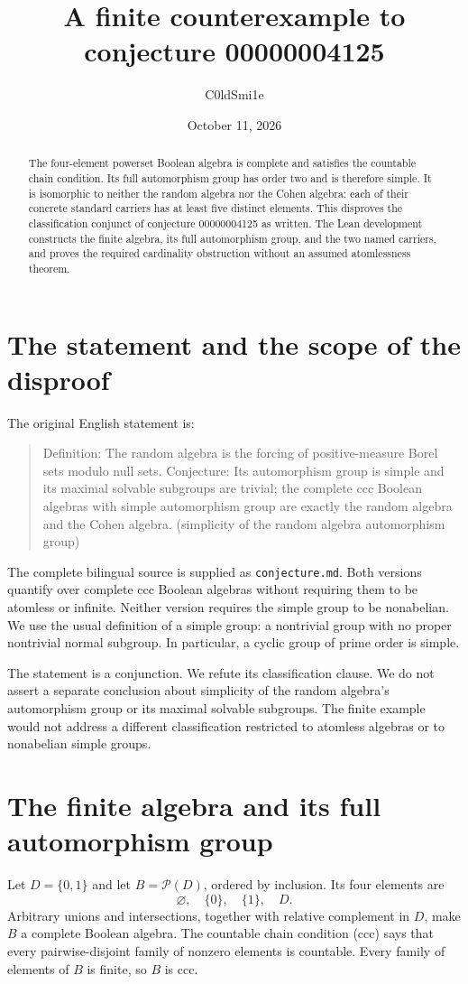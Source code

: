 \documentclass[11pt]{article}
\title{A finite counterexample to conjecture 00000004125}
\author{C0ldSmi1e}
\date{October 11, 2026}
\begin{document}
\maketitle
\begin{abstract}
The four-element powerset Boolean algebra is complete and satisfies the countable chain condition. Its full automorphism group has order two and is therefore simple. It is isomorphic to neither the random algebra nor the Cohen algebra: each of their concrete standard carriers has at least five distinct elements. This disproves the classification conjunct of conjecture 00000004125 as written. The Lean development constructs the finite algebra, its full automorphism group, and the two named carriers, and proves the required cardinality obstruction without an assumed atomlessness theorem.
\end{abstract}

\section{The statement and the scope of the disproof}
The original English statement is:
\begin{quote}
Definition: The random algebra is the forcing of positive-measure Borel sets modulo null sets. Conjecture: Its automorphism group is simple and its maximal solvable subgroups are trivial; the complete ccc Boolean algebras with simple automorphism group are exactly the random algebra and the Cohen algebra. (simplicity of the random algebra automorphism group)
\end{quote}
The complete bilingual source is supplied as \texttt{conjecture.md}. Both versions quantify over complete ccc Boolean algebras without requiring them to be atomless or infinite. Neither version requires the simple group to be nonabelian. We use the usual definition of a simple group: a nontrivial group with no proper nontrivial normal subgroup. In particular, a cyclic group of prime order is simple.

The statement is a conjunction. We refute its classification clause. We do not assert a separate conclusion about simplicity of the random algebra's automorphism group or its maximal solvable subgroups. The finite example would not address a different classification restricted to atomless algebras or to nonabelian simple groups.

\section{The finite algebra and its full automorphism group}
Let $D=\{0,1\}$ and let $B=\mathcal P(D)$, ordered by inclusion. Its four elements are
\[
\varnothing,\quad \{0\},\quad \{1\},\quad D.
\]
Arbitrary unions and intersections, together with relative complement in $D$, make $B$ a complete Boolean algebra. The countable chain condition (ccc) says that every pairwise-disjoint family of nonzero elements is countable. Every family of elements of $B$ is finite, so $B$ is ccc.
\end{document}
